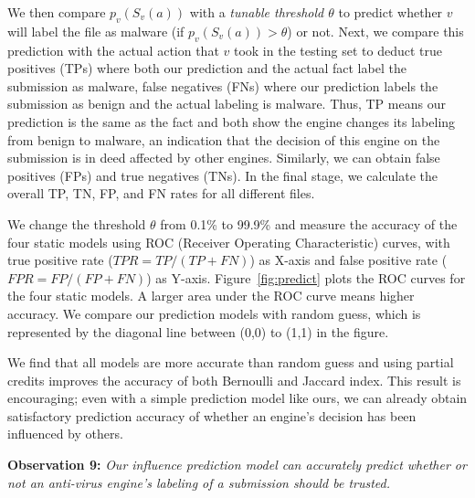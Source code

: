 We then compare $p_v(S_v(a))$ with a {\em tunable threshold $\theta$} to predict whether $v$ will label the file as malware (if $p_v(S_v(a))>\theta$) or not.
Next, we compare this prediction with the actual action that $v$ took in the testing set to deduct true positives (TPs) where both our prediction 
and the actual fact label the submission as malware, 
false negatives (FNs) where our prediction labels the submission as benign and the actual labeling is malware. 
Thus, TP means our prediction is the same as the fact 
and both show the engine changes its labeling from benign to malware, an indication that the decision 
of this engine on the submission is in deed affected by other engines.
Similarly, we can obtain false positives (FPs) 
and true negatives (TNs).
In the final stage, we calculate the overall TP, TN, FP, and FN rates for all different files.



We change the threshold $\theta$ from 0.1\% to 99.9\% 
and measure the accuracy of the four static models using ROC (Receiver Operating Characteristic) curves,
with true positive rate ($TPR = TP/(TP+FN)$) as X-axis
and false positive rate ($FPR = FP/(FP + FN)$) as Y-axis. 
Figure~\ref{fig:predict} plots the ROC curves for the four static models.
A larger area under the ROC curve means higher accuracy.
We compare our prediction models with random guess, 
which is represented by the diagonal line between (0,0) to (1,1) in the figure. 

We find that all models are more accurate than random guess
and using partial credits improves the accuracy of both Bernoulli and Jaccard index.
This result is encouraging;
even with a simple prediction model like ours, we can already obtain satisfactory prediction accuracy of whether an engine's decision has been influenced by others.

{\bf Observation 9:} 
{\em Our influence prediction model can accurately predict whether or not an anti-virus engine's labeling of a submission should be trusted. }

